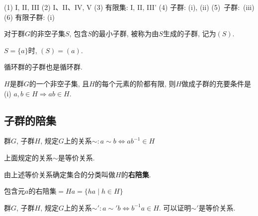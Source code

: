 \begin{Note}[验证非空集合是群的方法]
(1) I, II, III (2) I、II、IV, V (3) 有限集: I, II, III'
(4) 子群: (i), (ii) \mbox{(5) 子群: (iii)} (6) 有限子群: (i)
\end{Note}

\begin{Definition}[生成子群]
对于群$G$的非空子集$S$, 包含$S$的最小子群, 被称为由$S$生成的子群, 记为$(S)$.
\end{Definition}

\begin{Theorem}
$S = \{a\}$时, $(S) = (a)$.
\end{Theorem}


\begin{Proposition}
循环群的子群也是循环群.
\end{Proposition}

\begin{Proposition}
$H$是群$G$的一个非空子集, 且$H$的每个元素的阶都有限,
则$H$做成子群的充要条件是 (i) $a, b \in H \Rightarrow ab \in H$.
\end{Proposition}

\subsection{子群的陪集}

\begin{Definition}
群$G$, 子群$H$, 规定$G$上的关系$\sim: a \sim b \Leftrightarrow a b^{-1} \in H$
\end{Definition}

\begin{Theorem}
上面规定的关系$\sim$是等价关系.
\end{Theorem}

\begin{Definition}[右陪集]
由上述等价关系确定集合的分类叫做$H$的\textbf{右陪集}.
\end{Definition}

\begin{Theorem}
包含元$a$的右陪集$ = Ha =  \{ ha \mid h \in H \}$
\end{Theorem}

\begin{Definition}
群$G$, 子群$H$, 规定$G$上的关系$\sim': a \sim 'b \Leftrightarrow b^{-1} a \in H$. 可以证明$\sim'$是等价关系.
\end{Definition}

